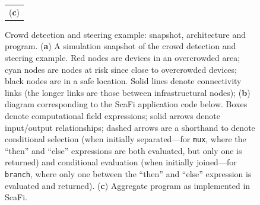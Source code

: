 \documentclass[jsan,article,accept,moreauthors,pdftex]{Definitions/mdpi}
\begin{document}
\begin{figure}[H]
\begin{tabular}{cc}
\multicolumn{2}{c}{({\bf c})}\\

\end{tabular}

\caption{Crowd detection and steering example: snapshot, architecture and program. (\textbf{a}) A simulation snapshot of the crowd detection and steering example. Red nodes are devices in an overcrowded area;
 cyan nodes are nodes at risk since close to overcrowded devices;
 black nodes are in a safe location. Solid lines denote connectivity links (the longer links are those between infrastructural nodes); (\textbf{b}) diagram corresponding to the ScaFi application code below. Boxes denote computational field expressions; solid arrows denote input/output relationships;
dashed arrows are a shorthand to denote conditional selection (when initially separated---for \lstinline|mux|, where the ``then'' and ``else'' expressions are both evaluated, but only one is returned) and conditional evaluation (when initially joined---for \lstinline|branch|, where only one between the ``then'' and  ``else'' expression is evaluated and returned). (\textbf{c}) Aggregate program as implemented in ScaFi.}
\label{fig:crowd-example}
\end{figure}
\end{document}
